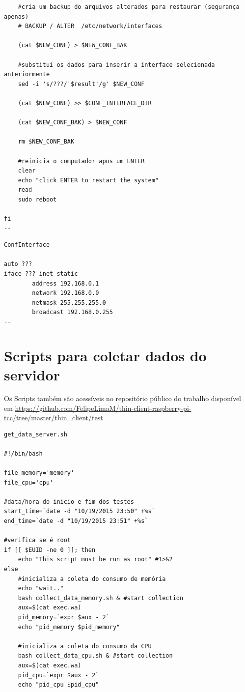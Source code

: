 \documentclass[
	12pt,				%
	openright,			%
	twoside,			%
	a4paper,			%
	chapter=TITLE,		%
	english,			%
	brazil				%
	]{abntex2}
\begin{document}
\begin{apendicesenv}
\begin{verbatim}
	#cria um backup do arquivos alterados para restaurar (segurança apenas)
	# BACKUP / ALTER  /etc/network/interfaces
	
	(cat $NEW_CONF) > $NEW_CONF_BAK

	#substitui os dados para inserir a interface selecionada anteriormente
	sed -i 's/???/'$result'/g' $NEW_CONF

	(cat $NEW_CONF) >> $CONF_INTERFACE_DIR

	(cat $NEW_CONF_BAK) > $NEW_CONF

	rm $NEW_CONF_BAK
	
	#reinicia o computador apos um ENTER
	clear
	echo "click ENTER to restart the system"
	read
	sudo reboot	
	
fi
--
\end{verbatim}

\begin{verbatim}
ConfInterface

auto ???
iface ??? inet static
        address 192.168.0.1
        network 192.168.0.0
        netmask 255.255.255.0
        broadcast 192.168.0.255
--
\end{verbatim}


\chapter{Scripts para coletar dados do servidor}
\label{script:GetDataServer}
Os Scripts também são acessíveis no repositório público do trabalho disponível em \url{https://github.com/FelipeLimaM/thin-client-raspberry-pi-tcc/tree/master/thin_client/test}

\begin{verbatim}
get_data_server.sh

#!/bin/bash

file_memory='memory'
file_cpu='cpu'
 
#data/hora do inicio e fim dos testes
start_time=`date -d "10/19/2015 23:50" +%s`
end_time=`date -d "10/19/2015 23:51" +%s`

#verifica se é root
if [[ $EUID -ne 0 ]]; then
    echo "This script must be run as root" #1>&2
else
	#inicializa a coleta do consumo de memória
	echo "wait.."
	bash collect_data_memory.sh & #start collection
	aux=$(cat exec.wa)
	pid_memory=`expr $aux - 2`
	echo "pid_memory $pid_memory"
	
	#inicializa a coleta do consumo da CPU
	bash collect_data_cpu.sh & #start collection
	aux=$(cat exec.wa)
	pid_cpu=`expr $aux - 2`
	echo "pid_cpu $pid_cpu"


\end{verbatim}
\end{apendicesenv}
\end{document}
